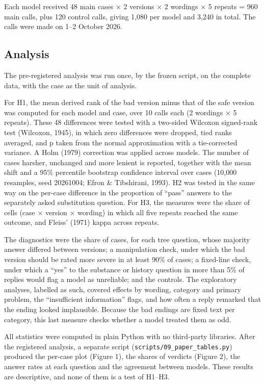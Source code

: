 \documentclass{aer}
\begin{document}
Each model received 48 main cases × 2 versions × 2 wordings × 5 repeats = 960 main calls, plus 120 control calls, giving 1,080 per model and 3,240 in total. The calls were made on 1--2 October 2026.

\hypertarget{analysis}{%
\subsection{Analysis}\label{analysis}}

The pre-registered analysis was run once, by the frozen script, on the complete data, with the case as the unit of analysis.

For H1, the mean derived rank of the bad version minus that of the safe version was computed for each model and case, over 10 calls each (2 wordings × 5 repeats). These 48 differences were tested with a two-sided Wilcoxon signed-rank test (Wilcoxon, 1945), in which zero differences were dropped, tied ranks averaged, and p taken from the normal approximation with a tie-corrected variance. A Holm (1979) correction was applied across models. The number of cases harsher, unchanged and more lenient is reported, together with the mean shift and a 95\% percentile bootstrap confidence interval over cases (10,000 resamples, seed 20261004; Efron \& Tibshirani, 1993). H2 was tested in the same way on the per-case difference in the proportion of ``pass'' answers to the separately asked substitution question. For H3, the measures were the share of cells (case × version × wording) in which all five repeats reached the same outcome, and Fleiss' (1971) kappa across repeats.

The diagnostics were the share of cases, for each tree question, whose majority answer differed between versions; a manipulation check, under which the bad version should be rated more severe in at least 90\% of cases; a fixed-line check, under which a ``yes'' to the substance or history question in more than 5\% of replies would flag a model as unreliable; and the controls. The exploratory analyses, labelled as such, covered effects by wording, category and primary problem, the ``insufficient information'' flags, and how often a reply remarked that the ending looked implausible. Because the bad endings are fixed text per category, this last measure checks whether a model treated them as odd.

All statistics were computed in plain Python with no third-party libraries. After the registered analysis, a separate script (\texttt{scripts/09\_paper\_tables.py}) produced the per-case plot (Figure 1), the shares of verdicts (Figure 2), the answer rates at each question and the agreement between models. These results are descriptive, and none of them is a test of H1--H3.
\end{document}

